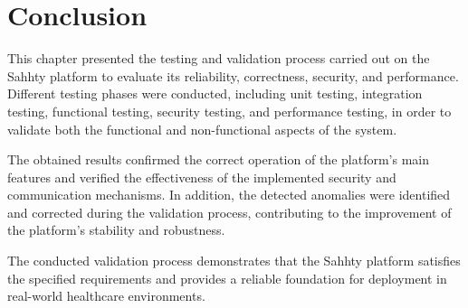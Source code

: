 \section{Conclusion}

This chapter presented the testing and validation process carried out on the Sahhty platform to evaluate its reliability, correctness, security, and performance. Different testing phases were conducted, including unit testing, integration testing, functional testing, security testing, and performance testing, in order to validate both the functional and non-functional aspects of the system.

The obtained results confirmed the correct operation of the platform’s main features and verified the effectiveness of the implemented security and communication mechanisms. In addition, the detected anomalies were identified and corrected during the validation process, contributing to the improvement of the platform’s stability and robustness.

The conducted validation process demonstrates that the Sahhty platform satisfies the specified requirements and provides a reliable foundation for deployment in real-world healthcare environments.